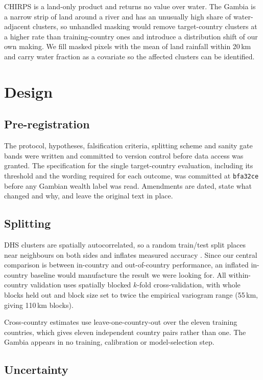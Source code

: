 \documentclass[11pt]{article}
\begin{document}
CHIRPS is a land-only product and returns no value over water. The Gambia is a
narrow strip of land around a river and has an unusually high share of
water-adjacent clusters, so unhandled masking would remove target-country
clusters at a higher rate than training-country ones and introduce a
distribution shift of our own making. We fill masked pixels with the mean of
land rainfall within 20\,km and carry water fraction as a covariate so the
affected clusters can be identified.

\section{Design}
\label{sec:preregistration}

\subsection{Pre-registration}

The protocol, hypotheses, falsification criteria, splitting scheme and sanity
gate bands were written and committed to version control before data access was
granted. The specification for the single target-country evaluation, including
its threshold and the wording required for each outcome, was committed at
\texttt{bfa32ce} before any Gambian wealth label was read. Amendments are dated,
state what changed and why, and leave the original text in place.

\subsection{Splitting}

DHS clusters are spatially autocorrelated, so a random train/test split places
near neighbours on both sides and inflates measured accuracy
\citep{roberts2017,ploton2020}. Since our central
comparison is between in-country and out-of-country performance, an inflated
in-country baseline would manufacture the result we were looking for. All
within-country validation uses spatially blocked $k$-fold cross-validation, with
whole blocks held out and block size set to twice the empirical variogram range
(55\,km, giving 110\,km blocks).

Cross-country estimates use leave-one-country-out over the eleven training
countries, which gives eleven independent country pairs rather than one. The
Gambia appears in no training, calibration or model-selection step.

\subsection{Uncertainty}
\end{document}
